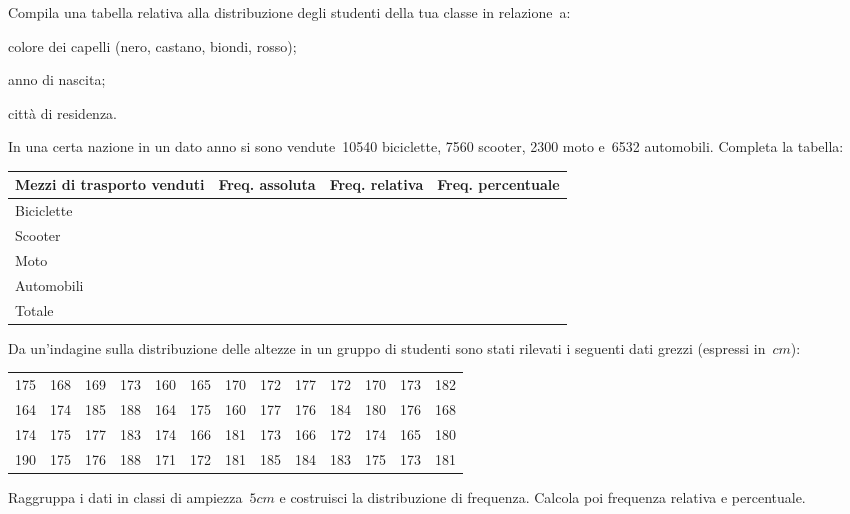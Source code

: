 \subsubsection*{}

\begin{esercizio}
\label{ese:A.2}
Compila una tabella relativa alla distribuzione degli studenti della tua 
classe in relazione~a:
\begin{itemize*}
\item colore dei capelli (nero, castano, biondi, rosso);
\item anno di nascita;
\item città di residenza.
\end{itemize*}
\end{esercizio}

\begin{esercizio}
\label{ese:A.3}
In una certa nazione in un dato anno si sono vendute~10540 biciclette, 7560 
scooter, 2300 moto e~6532 automobili. Completa la tabella:
\begin{center}
 \begin{tabularx}{.9\textwidth}{Xccc}
\toprule
Mezzi di trasporto venduti & Freq. assoluta & Freq. relativa & Freq. 
percentuale \\
\midrule
Biciclette & & & \\
Scooter & & & \\
Moto & & & \\
Automobili & & & \\
\midrule
Totale & & & \\
\bottomrule
\end{tabularx}
\end{center}
\end{esercizio}

\begin{esercizio}
\label{ese:A.4}
Da un'indagine sulla distribuzione delle altezze in un gruppo di studenti 
sono stati rilevati i seguenti dati grezzi (espressi in~$\unit{cm}$):
\begin{center}
 \begin{tabular}{ccccccccccccc}
175 & 168 & 169 & 173 & 160 & 165 & 170 & 172 & 177 & 172 & 170 & 173 & 182 
\\
164 & 174 & 185 & 188 & 164 & 175 & 160 & 177 & 176 & 184 & 180 & 176 & 168 
\\
174 & 175 & 177 & 183 & 174 & 166 & 181 & 173 & 166 & 172 & 174 & 165 & 180 
\\
190 & 175 & 176 & 188 & 171 & 172 & 181 & 185 & 184 & 183 & 175 & 173 & 181 
\\
 \end{tabular}
\end{center}
Raggruppa i dati in classi di ampiezza~$5 \unit{cm}$ e costruisci la 
distribuzione di frequenza. Calcola poi frequenza relativa e percentuale.
\end{esercizio}

